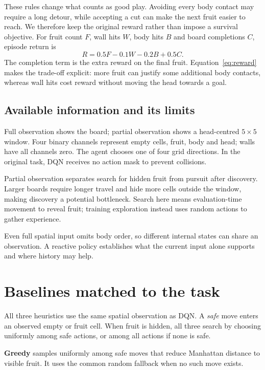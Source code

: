 \documentclass{article}
\begin{document}
\newpage
These rules change what counts as good play. Avoiding every body contact may require a long detour, while accepting a cut can make the next fruit easier to reach. We therefore keep the original reward rather than impose a survival objective. For fruit count $F$, wall hits $W$, body hits $B$ and board completions $C$, episode return is
\begin{equation}
R=0.5F-0.1W-0.2B+0.5C.
\label{eq:reward}
\end{equation}
The completion term is the extra reward on the final fruit. Equation~\ref{eq:reward} makes the trade-off explicit: more fruit can justify some additional body contacts, whereas wall hits cost reward without moving the head towards a goal.

\subsection{Available information and its limits}
Full observation shows the board; partial observation shows a head-centred $5\times5$ window. Four binary channels represent empty cells, fruit, body and head; walls have all channels zero. The agent chooses one of four grid directions. In the original task, DQN receives no action mask to prevent collisions.

Partial observation separates search for hidden fruit from pursuit after discovery. Larger boards require longer travel and hide more cells outside the window, making discovery a potential bottleneck. Search here means evaluation-time movement to reveal fruit; training exploration instead uses random actions to gather experience.

Even full spatial input omits body order, so different internal states can share an observation. A reactive policy establishes what the current input alone supports and where history may help.

\section{Baselines matched to the task}
All three heuristics use the same spatial observation as DQN. A \emph{safe} move enters an observed empty or fruit cell. When fruit is hidden, all three search by choosing uniformly among safe actions, or among all actions if none is safe.

\textbf{Greedy} samples uniformly among safe moves that reduce Manhattan distance to visible fruit. It uses the common random fallback when no such move exists.
\end{document}
